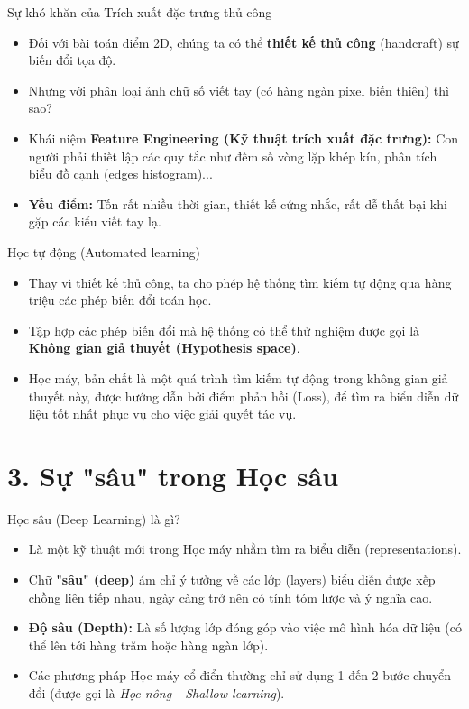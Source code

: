 \documentclass[aspectratio=169]{beamer}
\begin{document}
\begin{frame}{Sự khó khăn của Trích xuất đặc trưng thủ công}
    \begin{itemize}
        \item Đối với bài toán điểm 2D, chúng ta có thể \textbf{thiết kế thủ công} (handcraft) sự biến đổi tọa độ.
        \item Nhưng với phân loại ảnh chữ số viết tay (có hàng ngàn pixel biến thiên) thì sao?
        \item Khái niệm \textbf{Feature Engineering (Kỹ thuật trích xuất đặc trưng):} Con người phải thiết lập các quy tắc như đếm số vòng lặp khép kín, phân tích biểu đồ cạnh (edges histogram)...
        \item \textbf{Yếu điểm:} Tốn rất nhiều thời gian, thiết kế cứng nhắc, rất dễ thất bại khi gặp các kiểu viết tay lạ.
    \end{itemize}
\end{frame}

\begin{frame}{Học tự động (Automated learning)}
    \begin{itemize}
        \item Thay vì thiết kế thủ công, ta cho phép hệ thống tìm kiếm tự động qua hàng triệu các phép biến đổi toán học.
        \item Tập hợp các phép biến đổi mà hệ thống có thể thử nghiệm được gọi là \textbf{Không gian giả thuyết (Hypothesis space)}.
        \item Học máy, bản chất là một quá trình tìm kiếm tự động trong không gian giả thuyết này, được hướng dẫn bởi điểm phản hồi (Loss), để tìm ra biểu diễn dữ liệu tốt nhất phục vụ cho việc giải quyết tác vụ.
    \end{itemize}
\end{frame}

\section{3. Sự "sâu" trong Học sâu}

\begin{frame}{Học sâu (Deep Learning) là gì?}
    \begin{itemize}
        \item Là một kỹ thuật mới trong Học máy nhằm tìm ra biểu diễn (representations).
        \item Chữ \textbf{"sâu" (deep)} ám chỉ ý tưởng về các lớp (layers) biểu diễn được xếp chồng liên tiếp nhau, ngày càng trở nên có tính tóm lược và ý nghĩa cao.
        \item \textbf{Độ sâu (Depth):} Là số lượng lớp đóng góp vào việc mô hình hóa dữ liệu (có thể lên tới hàng trăm hoặc hàng ngàn lớp).
        \item Các phương pháp Học máy cổ điển thường chỉ sử dụng 1 đến 2 bước chuyển đổi (được gọi là \textit{Học nông - Shallow learning}).
    \end{itemize}
\end{frame}
\end{document}

